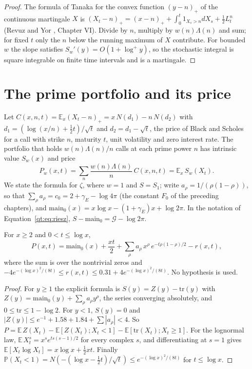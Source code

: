 \begin{proof}
The formula of Tanaka for the convex function $(y-n)_+$ of the continuous martingale $X$ is $(X_t-n)_+=(x-n)_++\int_0^t1_{X_s>n}dX_s+\frac12L^n_t$ (Revuz and Yor \cite{RevuzYor}, Chapter VI). Divide by $n$, multiply by $w(n)\Lambda(n)$ and sum; for fixed $t$ only the $n$ below the running maximum of $X$ contribute. For bounded $w$ the slope satisfies $S_w'(y)=O(1+\log^+y)$, so the stochastic integral is square integrable on finite time intervals and is a martingale.
\end{proof}

\section{The prime portfolio and its price}\label{gbm:sec:price}

Let $C(x,n,t)=\mathbb E_x(X_t-n)_+=x\,N(d_1)-n\,N(d_2)$ with $d_1=(\log(x/n)+\frac12t)/\sqrt t$ and $d_2=d_1-\sqrt t$, the price of Black and Scholes \cite{BlackScholes} for a call with strike $n$, maturity $t$, unit volatility and zero interest rate. The portfolio that holds $w(n)\Lambda(n)/n$ calls at each prime power $n$ has intrinsic value $S_w(x)$ and price
\[
P_w(x,t)=\sum_n\frac{w(n)\Lambda(n)}n\,C(x,n,t)=\mathbb E_x\,S_w(X_t).
\]
We state the formula for $\zeta$, where $w=1$ and $S=S_1$; write $a_\rho=1/(\rho(1-\rho))$, so that $\sum_\rho a_\rho=c_0=2+\gamma_E-\log4\pi$ (the constant $F_0$ of the preceding chapters), and $\mathrm{main}_0(x)=x\log x-(1+\gamma_E)x+\log2\pi$. In the notation of Equation~\eqref{qt:eq:riesz}, $S-\mathrm{main}_0=\mathcal G-\log2\pi$.

\begin{theorem}\label{gbm:thm:price}
For $x\ge2$ and $0<t\le\log x$,
\[
P(x,t)=\mathrm{main}_0(x)+\frac{xt}2+\sum_\rho a_\rho\,x^\rho\,e^{-t\rho(1-\rho)/2}-r(x,t),
\]
where the sum is over the nontrivial zeros and $-4e^{-(\log x)^2/(8t)}\le r(x,t)\le0.31+4e^{-(\log x)^2/(8t)}$. No hypothesis is used.
\end{theorem}

\begin{proof}
For $y\ge1$ the explicit formula is $S(y)=Z(y)-\mathrm{tr}(y)$ with $Z(y)=\mathrm{main}_0(y)+\sum_\rho a_\rho y^\rho$, the series converging absolutely, and $0\le\mathrm{tr}\le1-\log2$. For $y<1$, $S(y)=0$ and $|Z(y)|\le e^{-1}+1.58+1.84+\sum|a_\rho|<4$. So $P=\mathbb E\,Z(X_t)-\mathbb E[Z(X_t);X_t<1]-\mathbb E[\mathrm{tr}(X_t);X_t\ge1]$. For the lognormal law, $\mathbb E\,X_t^s=x^se^{ts(s-1)/2}$ for every complex $s$, and differentiating at $s=1$ gives $\mathbb E[X_t\log X_t]=x\log x+\frac12xt$. Finally $\mathbb P(X_t<1)=N(-(\log x-\frac12t)/\sqrt t)\le e^{-(\log x)^2/(8t)}$ for $t\le\log x$.
\end{proof}

